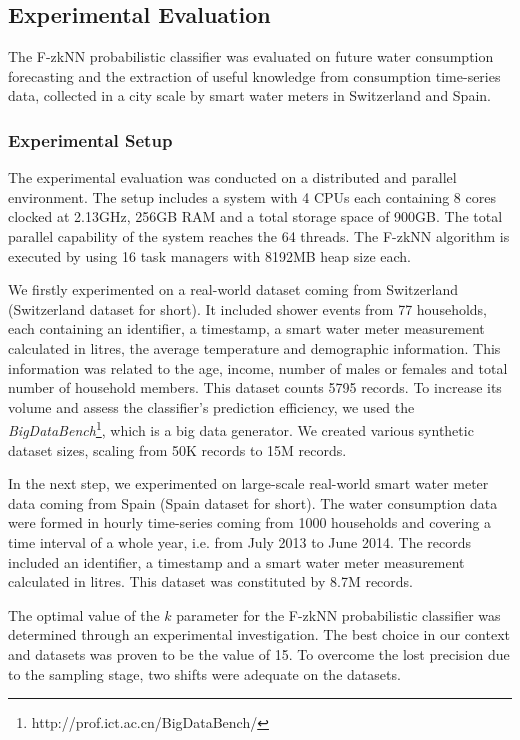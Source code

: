 \subsection{Experimental Evaluation}
\label{sec:evaluation}
The F-zkNN probabilistic classifier was evaluated on future water consumption forecasting and the extraction of useful knowledge from consumption time-series data, collected in a city scale by smart water meters in Switzerland and Spain. 

\subsubsection{Experimental Setup}
\label{subsec:expsetup}
The experimental evaluation was conducted on a distributed and parallel environment. The setup includes a system with 4 CPUs each containing 8 cores clocked at 2.13GHz, 256GB RAM and a total storage space of 900GB. The total parallel capability of the system reaches the 64 threads. The F-zkNN algorithm is executed by using 16 task managers with 8192MB heap size each.

We firstly experimented on a real-world dataset coming from Switzerland (Switzerland dataset for short). It included shower events from 77 households, each containing an identifier, a timestamp, a smart water meter measurement calculated in litres, the average temperature and demographic information. This information was related to the age, income, number of males or females and total number of household members. This dataset counts 5795 records. To increase its volume and assess the classifier's prediction efficiency, we used the \textit{BigDataBench}\footnote{http://prof.ict.ac.cn/BigDataBench/}, which is a big data generator. We created various synthetic dataset sizes, scaling from 50K records to 15M records.

In the next step, we experimented on large-scale real-world smart water meter data coming from Spain (Spain dataset for short). The water consumption data were formed in hourly time-series coming from 1000 households and covering a time interval of a whole year, i.e. from July 2013 to June 2014. The records included an identifier, a timestamp and a smart water meter measurement calculated in litres. This dataset was constituted by 8.7M records.

The optimal value of the $k$ parameter for the F-zkNN probabilistic classifier was determined through an experimental investigation. The best choice in our context and datasets was proven to be the value of 15. To overcome the lost precision due to the sampling stage, two shifts were adequate on the datasets.

